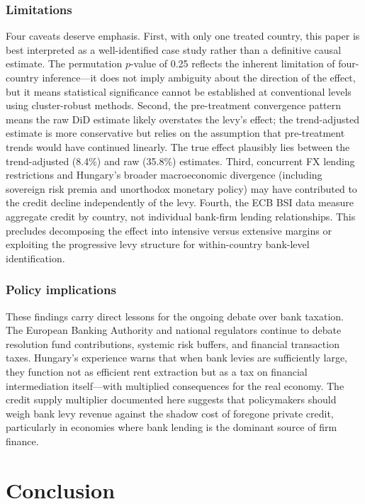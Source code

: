 \documentclass[12pt]{article}
\begin{document}
\subsubsection*{Limitations} Four caveats deserve emphasis. First, with only one treated country, this paper is best interpreted as a well-identified case study rather than a definitive causal estimate. The permutation $p$-value of 0.25 reflects the inherent limitation of four-country inference---it does not imply ambiguity about the direction of the effect, but it means statistical significance cannot be established at conventional levels using cluster-robust methods. Second, the pre-treatment convergence pattern means the raw DiD estimate likely overstates the levy's effect; the trend-adjusted estimate is more conservative but relies on the assumption that pre-treatment trends would have continued linearly. The true effect plausibly lies between the trend-adjusted (8.4\%) and raw (35.8\%) estimates. Third, concurrent FX lending restrictions and Hungary's broader macroeconomic divergence (including sovereign risk premia and unorthodox monetary policy) may have contributed to the credit decline independently of the levy. Fourth, the ECB BSI data measure aggregate credit by country, not individual bank-firm lending relationships. This precludes decomposing the effect into intensive versus extensive margins or exploiting the progressive levy structure for within-country bank-level identification.

\subsubsection*{Policy implications} These findings carry direct lessons for the ongoing debate over bank taxation. The European Banking Authority and national regulators continue to debate resolution fund contributions, systemic risk buffers, and financial transaction taxes. Hungary's experience warns that when bank levies are sufficiently large, they function not as efficient rent extraction but as a tax on financial intermediation itself---with multiplied consequences for the real economy. The credit supply multiplier documented here suggests that policymakers should weigh bank levy revenue against the shadow cost of foregone private credit, particularly in economies where bank lending is the dominant source of firm finance.


\section{Conclusion}
\end{document}
